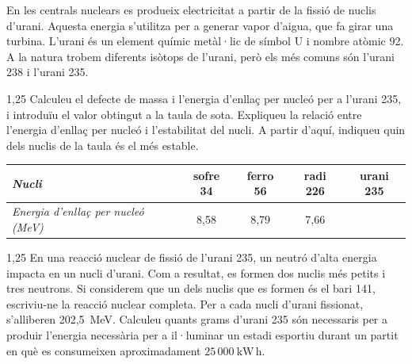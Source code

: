 En les centrals nuclears es produeix electricitat a partir de la fissió de nuclis d'urani. Aquesta energia s'utilitza per a generar vapor d'aigua, que fa girar una turbina. L'urani és un element químic metàl·lic de símbol U i nombre atòmic 92. A la natura trobem diferents isòtops de l'urani, però els més comuns són l'urani 238 i l'urani 235.

\begin{apartat}{1,25}
Calculeu el defecte de massa i l'energia d'enllaç per nucleó per a l'urani 235, i introduïu el valor obtingut a la taula de sota. Expliqueu la relació entre l'energia d'enllaç per nucleó i l'estabilitat del nucli. A partir d'aquí, indiqueu quin dels nuclis de la taula és el més estable.
\end{apartat}

\begin{center}
\begin{tabular}{|l|c|c|c|c|}
\hline
\textit{Nucli} & sofre 34 & ferro 56 & radi 226 & urani 235 \\
\hline
\textit{Energia d'enllaç per nucleó (MeV)} & 8,58 & 8,79 & 7,66 & \\
\hline
\end{tabular}
\end{center}

\begin{apartat}{1,25}
En una reacció nuclear de fissió de l'urani 235, un neutró d'alta energia impacta en un nucli d'urani. Com a resultat, es formen dos nuclis més petits i tres neutrons. Si considerem que un dels nuclis que es formen és el bari 141, escriviu-ne la reacció nuclear completa. Per a cada nucli d'urani fissionat, s'alliberen 202,5~MeV. Calculeu quants grams d'urani 235 són necessaris per a produir l'energia necessària per a il·luminar un estadi esportiu durant un partit en què es consumeixen aproximadament $25\,000\ \mathrm{kW\,h}$.
\end{apartat}

